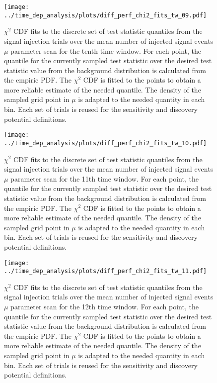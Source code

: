 \begin{figure}[H]
  \centering
  \texttt{[image: ../time\_dep\_analysis/plots/diff\_perf\_chi2\_fits\_tw\_09.pdf]}
  \caption[$\chi^2$ CDF fits for the 10th time window differential performance]{
     $\chi^2$ CDF fits to the discrete set of test statistic quantiles from the signal injection trials over the mean number of injected signal events $\mu$ parameter scan for the tenth time window.
     For each point, the quantile for the currently sampled test statistic over the desired test statistic value from the background distribution is calculated from the empiric PDF.
     The $\chi^2$ CDF is fitted to the points to obtain a more reliable estimate of the needed quantile.
     The density of the sampled grid point in $\mu$ is adapted to the needed quantity in each bin.
     Each set of trials is reused for the sensitivity and discovery potential definitions.
  }
  \label{fig:diff_perf_chi2_fits_tw_09}
\end{figure}
\begin{figure}[H]
  \centering
  \texttt{[image: ../time\_dep\_analysis/plots/diff\_perf\_chi2\_fits\_tw\_10.pdf]}
  \caption[$\chi^2$ CDF fits for the 11th time window differential performance]{
     $\chi^2$ CDF fits to the discrete set of test statistic quantiles from the signal injection trials over the mean number of injected signal events $\mu$ parameter scan for the 11th time window.
     For each point, the quantile for the currently sampled test statistic over the desired test statistic value from the background distribution is calculated from the empiric PDF.
     The $\chi^2$ CDF is fitted to the points to obtain a more reliable estimate of the needed quantile.
     The density of the sampled grid point in $\mu$ is adapted to the needed quantity in each bin.
     Each set of trials is reused for the sensitivity and discovery potential definitions.
  }
  \label{fig:diff_perf_chi2_fits_tw_10}
\end{figure}
\begin{figure}[H]
  \centering
  \texttt{[image: ../time\_dep\_analysis/plots/diff\_perf\_chi2\_fits\_tw\_11.pdf]}
  \caption[$\chi^2$ CDF fits for the 12th time window differential performance]{
     $\chi^2$ CDF fits to the discrete set of test statistic quantiles from the signal injection trials over the mean number of injected signal events $\mu$ parameter scan for the 12th time window.
     For each point, the quantile for the currently sampled test statistic over the desired test statistic value from the background distribution is calculated from the empiric PDF.
     The $\chi^2$ CDF is fitted to the points to obtain a more reliable estimate of the needed quantile.
     The density of the sampled grid point in $\mu$ is adapted to the needed quantity in each bin.
     Each set of trials is reused for the sensitivity and discovery potential definitions.
  }
  \label{fig:diff_perf_chi2_fits_tw_11}
\end{figure}
